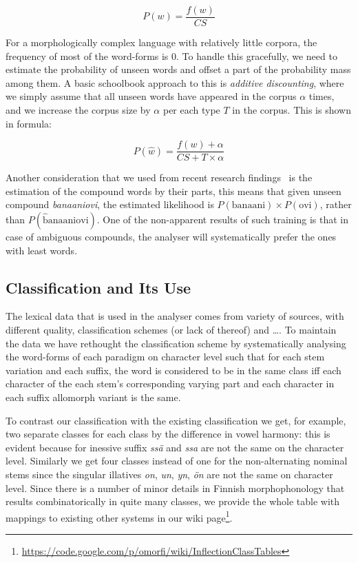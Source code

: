 \documentclass[a4paper,12pt]{article}
\begin{document}
$$
P(w) = \frac{f(w)}{CS}
$$

For a morphologically complex language with relatively little corpora, the
frequency of most of the word-forms is $0$. To handle this gracefully, we need
to estimate the probability of unseen words and offset a part of the
probability mass among them. A basic schoolbook approach to this is
\emph{additive discounting}, where we simply assume that all unseen words have
appeared in the corpus $\alpha$ times, and we increase the corpus size by
$\alpha$ per each type $T$ in the corpus. This is shown in formula:

$$
P(\hat w) = \frac{f(w) + \alpha}{CS + T \times \alpha}
$$

Another consideration that we used from recent research
findings~\cite{pirinen2009weighting} is the estimation of the compound words by
their parts, this means that given unseen compound \emph{banaaniovi}, the
estimated likelihood is $P(\mathrm{banaani}) \times P(\mathrm{ovi})$, rather
than $P(\mathrm{\hat banaaniovi})$. One of the non-apparent results of such
training is that in case of ambiguous compounds, the analyser will
systematically prefer the ones with least words.

\subsection{Classification and Its Use}

The lexical data that is used in the analyser comes from variety of sources,
with different quality, classification schemes (or lack of thereof) and \ldots.
To maintain the data we have rethought the classification scheme by
systematically analysing the word-forms of each paradigm on character level such
that for each stem variation and each suffix, the word is considered to be in
the same class iff each character of the each stem's corresponding varying part
and each character in each suffix allomorph variant is the same. 

To contrast our classification with the existing classification we get, for
example, two separate classes for each class by the difference in vowel
harmony: this is evident because for inessive suffix \emph{ssä} and \emph{ssa}
are not the same on the character level. Similarly we get four classes instead
of one for the non-alternating nominal stems since the singular illatives
\emph{on}, \emph{un}, \emph{yn}, \emph{ön} are not the same on character level.
Since there is a number of minor details in Finnish morphophonology that
results combinatorically in quite many classes, we provide the whole table with
mappings to existing other systems in our wiki
page\footnote{\url{https://code.google.com/p/omorfi/wiki/InflectionClassTables}}.
\end{document}
